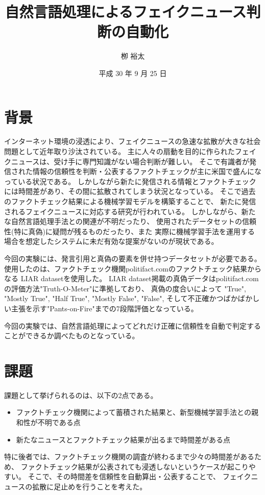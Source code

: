 \documentclass[twocolumn, a4paper, uplatex]{UECIEresume}
\title{自然言語処理によるフェイクニュース判断の自動化}
\date{平成 30 年 9 月 25 日}
\affiliation{総合情報学科 メディア情報学 コース}
\author{栁 裕太}
\begin{document}
\maketitle

\section{背景}
インターネット環境の浸透により、フェイクニュースの急速な拡散が大きな社会問題として近年取り沙汰されている。
主に人々の扇動を目的に作られたフェイクニュースは、受け手に専門知識がない場合判断が難しい。
そこで有識者が発信された情報の信頼性を判断・公表するファクトチェックが主に米国で盛んになっている状況である。
しかしながら新たに発信される情報とファクトチェックには時間差があり、その間に拡散されてしまう状況となっている。
そこで過去のファクトチェック結果による機械学習モデルを構築することで、
新たに発信されるフェイクニュースに対応する研究が行われている\cite{nb}\cite{gilda}。
しかしながら、新たな自然言語処理手法との関連が不明だったり、
使用されたデータセットの信頼性(特に真偽)に疑問が残るものだったり、また
実際に機械学習手法を運用する場合を想定したシステムに未だ有効な提案がないのが現状である。

今回の実験には、発言引用と真偽の要素を併せ持つデータセットが必要である。
使用したのは、ファクトチェック機関politifact.comのファクトチェック結果からなる
LIAR datasetを使用した\cite{pants}。
LIAR dataset掲載の真偽データはpolitifact.comの評価方法"Truth-O-Meter"に準拠\cite{pants}しており、
真偽の度合いによって
"True", "Mostly True", "Half True", "Mostly False", "False",
そして不正確かつばかばかしい主張を示す"Pants-on-Fire"までの7段階評価となっている\cite{truth}。

今回の実験では、自然言語処理によってどれだけ正確に信頼性を自動で判定することができるか調べたものとなっている。

\section{課題}
課題として挙げられるのは、以下の2点である。
\begin{itemize}
  \item ファクトチェック機関によって蓄積された結果と、新型機械学習手法との親和性が不明である点
  \item 新たなニュースとファクトチェック結果が出るまで時間差がある点
\end{itemize}
特に後者では、ファクトチェック機関の調査が終わるまで少々の時間差があるため、
ファクトチェック結果が公表されても浸透しないというケースが起こりやすい。
そこで、その時間差を信頼性を自動算出・公表することで、
フェイクニュースの拡散に足止めを行うことを考えた。
\end{document}
